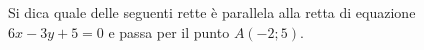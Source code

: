 Si dica quale delle seguenti rette è parallela alla retta di equazione \( \displaystyle 6x-3y+5=0\) e passa per il punto 
\( \displaystyle A\left(-2;5\right)\). 